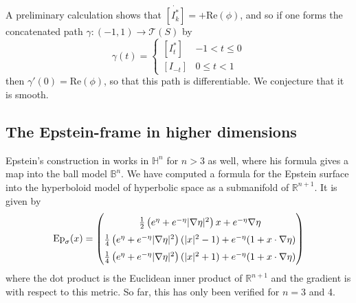 \documentclass{amsart}
\newcommand{\R}{\mathbb{R}}
\renewcommand{\H}{\mathbb{H}}
\begin{document}
A preliminary calculation shows that $\dot{[I_k^*]} = +\mathrm{Re}(\phi)$, and so if one forms the concatenated path $\gamma : (-1,1) \to \mathcal{T}(S)$ by 
\[
\gamma(t) = 
\begin{cases}
[I_t^*]  & -1 < t \leq 0 \\
[I_{-t}] & 0 \leq t < 1
\end{cases}
\]
then $\gamma'(0) = \mathrm{Re}(\phi)$, so that this path is differentiable. 
We conjecture that it is smooth. 

\subsection{The Epstein-frame in higher dimensions}



Epstein's construction in \cite{epstein1984} works in $\H^n$ for $n > 3$ as well, where his formula gives a map into the ball model $\mathbb{B}^n$.
We have computed a formula for the Epstein surface into the hyperboloid model of hyperbolic space as a submanifold of $\R^{n+1}$.
It is given by 
\[
\mathrm{Ep}_\sigma(x) = 
\def\arraystretch{1.5}
\begin{pmatrix}
\frac{1}{2}\left( e^\eta + e^{-\eta} | \nabla \eta |^2 \right)x + e^{-\eta} \nabla \eta \\
\frac{1}{4} \left(e^\eta + e^{-\eta} | \nabla \eta |^2 \right)( | x |^2 - 1) + e^{-\eta}(1 + x \cdot \nabla\eta) \\
\frac{1}{4} \left(e^\eta + e^{-\eta} | \nabla \eta |^2 \right)( | x |^2 + 1) + e^{-\eta}(1 + x \cdot \nabla\eta)
\end{pmatrix}
\]
where the dot product is the Euclidean inner product of $\R^{n+1}$ and the gradient is with respect to this metric.
So far, this has only been verified for $n = 3$ and 4.
\end{document}
